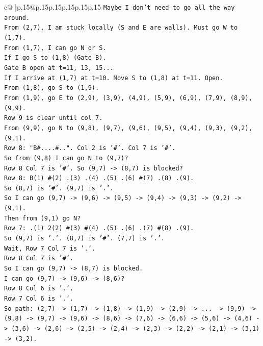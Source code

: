 \documentclass{article}
\begin{document}
{\begin{supertabular}{c@{$\;$}|p{.15\linewidth}@{}p{.15\linewidth}p{.15\linewidth}p{.15\linewidth}p{.15\linewidth}p{.15\linewidth}}
{{{\texttt{Maybe I don't need to go all the way around.} \\
\texttt{From (2,7), I am stuck locally (S and E are walls). Must go W to (1,7).} \\
\texttt{From (1,7), I can go N or S.} \\
\texttt{If I go S to (1,8) (Gate B).} \\
\texttt{Gate B open at t=11, 13, 15...} \\
\texttt{If I arrive at (1,7) at t=10. Move S to (1,8) at t=11. Open.} \\
\texttt{From (1,8), go S to (1,9).} \\
\texttt{From (1,9), go E to (2,9), (3,9), (4,9), (5,9), (6,9), (7,9), (8,9), (9,9).} \\
\texttt{Row 9 is clear until col 7.} \\
\texttt{From (9,9), go N to (9,8), (9,7), (9,6), (9,5), (9,4), (9,3), (9,2), (9,1).} \\
\texttt{Row 8: "B\#....\#..". Col 2 is '\#'. Col 7 is '\#'.} \\
\texttt{So from (9,8) I can go N to (9,7)?} \\
\texttt{Row 8 Col 7 is '\#'. So (9,7) {-}> (8,7) is blocked?} \\
\texttt{Row 8: B(1) \#(2) .(3) .(4) .(5) .(6) \#(7) .(8) .(9).} \\
\texttt{So (8,7) is '\#'. (9,7) is '.'.} \\
\texttt{So I can go (9,7) {-}> (9,6) {-}> (9,5) {-}> (9,4) {-}> (9,3) {-}> (9,2) {-}> (9,1).} \\
\texttt{Then from (9,1) go N?} \\
\texttt{Row 7: .(1) 2(2) \#(3) \#(4) .(5) .(6) .(7) \#(8) .(9).} \\
\texttt{So (9,7) is '.'. (8,7) is '\#'. (7,7) is '.'.} \\
\texttt{Wait, Row 7 Col 7 is '.'.} \\
\texttt{Row 8 Col 7 is '\#'.} \\
\texttt{So I can go (9,7) {-}> (8,7) is blocked.} \\
\texttt{I can go (9,7) {-}> (9,6) {-}> (8,6)?} \\
\texttt{Row 8 Col 6 is '.'.} \\
\texttt{Row 7 Col 6 is '.'.} \\
\texttt{So path: (2,7) {-}> (1,7) {-}> (1,8) {-}> (1,9) {-}> (2,9) {-}> ... {-}> (9,9) {-}> (9,8) {-}> (9,7) {-}> (9,6) {-}> (8,6) {-}> (7,6) {-}> (6,6) {-}> (5,6) {-}> (4,6) {-}> (3,6) {-}> (2,6) {-}> (2,5) {-}> (2,4) {-}> (2,3) {-}> (2,2) {-}> (2,1) {-}> (3,1) {-}> (3,2).} \\
}}}
\end{supertabular}}
\end{document}
